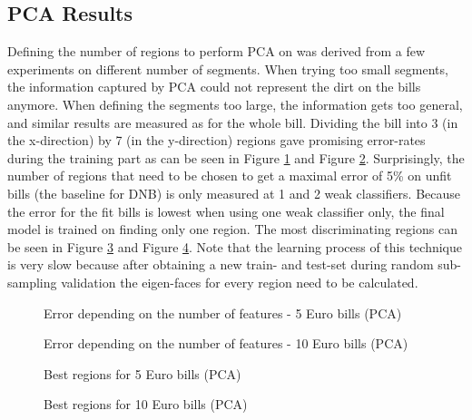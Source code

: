 \documentclass[11pt,twocolumn]{article}
\begin{document}
		\subsection{PCA Results}\label{sec:pca_results}
			Defining the number of regions to perform PCA on was derived from a few experiments on different number of segments. When trying too small segments, the information captured by PCA could not represent the dirt on the bills anymore. When defining the segments too large, the information gets too general, and similar results are measured as for the whole bill. Dividing the bill into 3 (in the x-direction) by 7 (in the y-direction) regions gave promising error-rates during the training part as can be seen in Figure \ref{pca_plot5} and Figure \ref{pca_plot10}. Surprisingly, the number of regions that need to be chosen to get a maximal error of 5\% on unfit bills (the baseline for DNB) is only measured at 1 and 2 weak classifiers. Because the error for the fit bills is lowest when using one weak classifier only, the final model is trained on finding only one region. The most discriminating regions can be seen in Figure \ref{pca_regions5} and Figure \ref{pca_regions10}. Note that the learning process of this technique is very slow because after obtaining a new train- and test-set during random sub-sampling validation the eigen-faces for every region need to be calculated.

		\begin{figure}[!hbtp]
			\centering
			\caption{Error depending on the number of features - 5 Euro bills (PCA)}
			\label{pca_plot5}
		\end{figure}

		\begin{figure}[!hbtp]
			\centering
			\caption{Error depending on the number of features - 10 Euro bills (PCA)}
			\label{pca_plot10}
		\end{figure}

		\begin{figure}[!hbtp]
			\centering
			\caption{Best regions for 5 Euro bills (PCA)}
			\label{pca_regions5}
		\end{figure}
		\begin{figure}[!hbtp]
			\centering
			\caption{Best regions for 10 Euro bills (PCA)}
			\label{pca_regions10}
		\end{figure}
		
\end{document}
